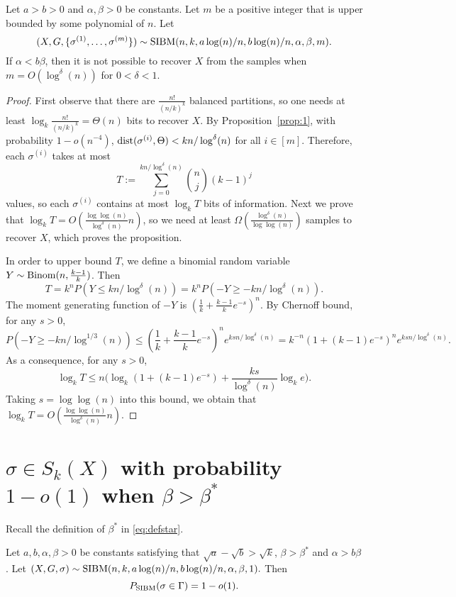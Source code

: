 \documentclass{article}
\begin{document}
\begin{proposition}  \label{prop:ab}
Let $a>b>0$ and $\alpha,\beta>0$ be constants. Let $m$ be a positive integer that is upper bounded by some polynomial of $n$.
Let 
$$
(X,G,\{\sigma^{(1)},\dots,\sigma^{(m)}\})\sim \operatorname{SIBM}(n,k, a\log(n)/n, b\log(n)/n,\alpha,\beta, m) .
$$
If $\alpha<b\beta$, then it is not possible to recover $X$ from the samples when $m=O(\log^{\delta}(n))$ for $0 < \delta < 1$.
\end{proposition}

\begin{proof}
First observe that there are $\frac{n!}{(n/k)^k}$ balanced partitions, so one needs at least $\log_k \frac{n!}{(n/k)^k}=\Theta(n)$ bits to recover $X$.
By Proposition~\ref{prop:1}, with probability $1-o(n^{-4})$, $\operatorname{dist}(\sigma^{(i)}, \Theta)< kn/\log^{\delta}(n)$
for all $i\in[m]$. Therefore, each $\sigma^{(i)}$ takes at most
$$
T:=\sum_{j=0}^{kn/\log^{\delta}(n)} \binom{n}{j}(k-1)^j
$$
values, so each $\sigma^{(i)}$ contains at most $\log_k T$ bits of information. Next we prove that $\log_k T=O(\frac{\log\log(n)}{\log^{\delta}(n)} n)$, so we need at least $\Omega(\frac{\log^{\delta}(n)}{\log\log(n)})$ samples to recover $X$, which proves the proposition.

In order to upper bound $T$, we define a binomial random variable $Y\sim\operatorname{Binom}(n,\frac{k-1}{k})$. Then
$$
T=k^n P(Y\le kn/\log^{\delta}(n))
= k^n P(-Y\ge -kn/\log^{\delta}(n)).
$$
The moment generating function of $-Y$ is $(\frac{1}{k}+\frac{k-1}{k}e^{-s})^n$. By Chernoff bound, for any $s>0$,
$$
P(-Y\ge - kn/\log^{1/3}(n)) \le
(\frac{1}{k}+\frac{k-1}{k}e^{-s})^n
e^{ksn/\log^{\delta}(n)}
= k^{-n} (1+(k-1)e^{-s})^n e^{ksn/\log^{\delta}(n)} .
$$
As a consequence, for any $s>0$,
$$
\log_k T\le n\Big(\log_k(1+(k-1)e^{-s})
+\frac{ks}{\log^{\delta}(n)}\log_k e \Big) .
$$
Taking $s=\log\log(n)$ into this bound, we obtain that $\log_k T=O(\frac{\log\log(n)}{\log^{\delta}(n)} n)$.
\end{proof}

\section{$\sigma \in S_k(X)$ with probability $1-o(1)$ when $\beta>\beta^\ast$} \label{sect:equal}

Recall the definition of $\beta^\ast$ in \eqref{eq:defstar}.
\begin{proposition} \label{prop:tt}
Let $a,b,\alpha,\beta> 0$ be constants satisfying that $\sqrt{a}-\sqrt{b} > \sqrt{k}$, $\beta>\beta^\ast$ and $\alpha>b\beta$. 
Let 
$
(X,G,\sigma) \sim \operatorname{SIBM}(n,k, a\log(n)/n, b\log(n)/n,\alpha,\beta, 1) .
$
Then
$$
P_{\operatorname{SIBM}}(\sigma \in \Gamma)=1-o(1) .
$$
\end{proposition}
\end{document}
